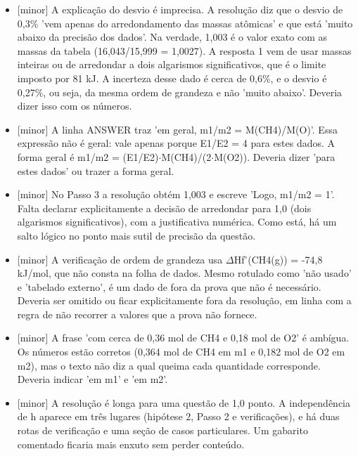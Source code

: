 \documentclass{article}%
\begin{document}
\begin{itemize}%
\item%
{[}minor{]} A explicação do desvio é imprecisa. A resolução diz que o desvio de 0,3\% 'vem apenas do arredondamento das massas atômicas' e que está 'muito abaixo da precisão dos dados'. Na verdade, 1,003 é o valor exato com as massas da tabela (16,043/15,999 = 1,0027). A resposta 1 vem de usar massas inteiras ou de arredondar a dois algarismos significativos, que é o limite imposto por 81 kJ. A incerteza desse dado é cerca de 0,6\%, e o desvio é 0,27\%, ou seja, da mesma ordem de grandeza e não 'muito abaixo'. Deveria dizer isso com os números.%
\item%
{[}minor{]} A linha ANSWER traz 'em geral, m1/m2 = M(CH4)/M(O)'. Essa expressão não é geral: vale apenas porque E1/E2 = 4 para estes dados. A forma geral é m1/m2 = (E1/E2)$\cdot$M(CH4)/(2$\cdot$M(O2)). Deveria dizer 'para estes dados' ou trazer a forma geral.%
\item%
{[}minor{]} No Passo 3 a resolução obtém 1,003 e escreve 'Logo, m1/m2 = 1'. Falta declarar explicitamente a decisão de arredondar para 1,0 (dois algarismos significativos), com a justificativa numérica. Como está, há um salto lógico no ponto mais sutil de precisão da questão.%
\item%
{[}minor{]} A verificação de ordem de grandeza usa $\Delta$Hf$^\circ$(CH4(g)) = -74,8 kJ/mol, que não consta na folha de dados. Mesmo rotulado como 'não usado' e 'tabelado externo', é um dado de fora da prova que não é necessário. Deveria ser omitido ou ficar explicitamente fora da resolução, em linha com a regra de não recorrer a valores que a prova não fornece.%
\item%
{[}minor{]} A frase 'com cerca de 0,36 mol de CH4 e 0,18 mol de O2' é ambígua. Os números estão corretos (0,364 mol de CH4 em m1 e 0,182 mol de O2 em m2), mas o texto não diz a qual queima cada quantidade corresponde. Deveria indicar 'em m1' e 'em m2'.%
\item%
{[}minor{]} A resolução é longa para uma questão de 1,0 ponto. A independência de h aparece em três lugares (hipótese 2, Passo 2 e verificações), e há duas rotas de verificação e uma seção de casos particulares. Um gabarito comentado ficaria mais enxuto sem perder conteúdo.%
\end{itemize}%
\end{document}
